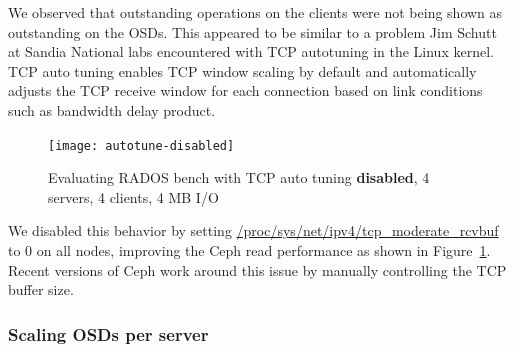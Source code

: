 We observed that outstanding operations on the clients were not being shown as
outstanding on the OSDs.  This appeared to be similar to a problem Jim Schutt
at Sandia National labs encountered with TCP autotuning in the Linux
kernel\cite{Jim:tcptune}.
TCP auto tuning enables TCP window scaling by default and automatically adjusts
the TCP receive window for each connection based on link conditions such as
bandwidth delay product. 

\begin{figure}[htb]
\centering
\texttt{[image: autotune-disabled]}
\caption{Evaluating RADOS bench with TCP auto tuning \textbf{disabled},  4 servers, 4
clients, 4 MB I/O}
\label{fig:rados-tcp-autotune-disabled}
\end{figure}

We disabled this behavior by setting 
\url{/proc/sys/net/ipv4/tcp_moderate_rcvbuf} to 0 on all nodes, improving the Ceph read performance as
shown in Figure~\ref{fig:rados-tcp-autotune-disabled}.
Recent versions of Ceph work around this issue by manually controlling the TCP
buffer size.  

\subsubsection{Scaling OSDs per server}

